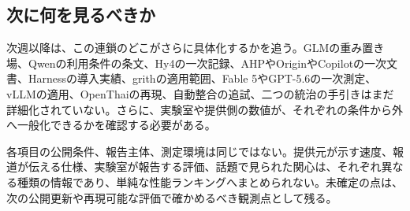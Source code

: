 \subsection*{次に何を見るべきか}
次週以降は、この連鎖のどこがさらに具体化するかを追う。GLMの重み置き場、Qwenの利用条件の条文、Hy4の一次記録、AHPやOriginやCopilotの一次文書、Harnessの導入実績、grithの適用範囲、Fable 5やGPT-5.6の一次測定、vLLMの適用、OpenThaiの再現、自動整合の追試、二つの統治の手引きはまだ詳細化されていない。さらに、実験室や提供側の数値が、それぞれの条件から外へ一般化できるかを確認する必要がある。

\begin{claimboundary}[この総括の読み方]
各項目の公開条件、報告主体、測定環境は同じではない。提供元が示す速度、報道が伝える仕様、実験室が報告する評価、話題で見られた関心は、それぞれ異なる種類の情報であり、単純な性能ランキングへまとめられない。未確定の点は、次の公開更新や再現可能な評価で確かめるべき観測点として残る。
\end{claimboundary}
